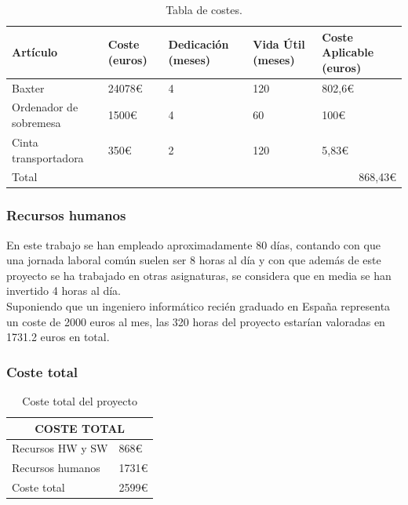 \begin{table}[H]
	\centering
	\begin{tabular}{|p{2cm} | p{2cm} | p{2cm} | p{2cm} | p{2cm} |}
		\hline %
		\textbf{Artículo} & \textbf{Coste} (euros) & \textbf{Dedicación} (meses) & \textbf{Vida Útil} (meses) & \textbf{Coste Aplicable} (euros)\\ %
		\hline	
		Baxter & 24078\euro & 4 & 120 & 802,6\euro \\
		\hline
		Ordenador de sobremesa & 1500\euro & 4 & 60 & 100\euro \\
		\hline
		Cinta transportadora & 350\euro & 2 & 120 & 5,83\euro \\
		\hline
		Total & \multicolumn{4}{r|}{868,43\euro} \\ 
		\hline
	\end{tabular}
	\caption{Tabla de costes.}
\end{table}

\subsubsection{Recursos humanos}
\noindent En este trabajo se han empleado aproximadamente 80 días, contando con que una jornada laboral común suelen ser 8 horas al día y con que además de este proyecto se ha trabajado en otras asignaturas, se considera que en media se han invertido 4 horas al día. \\

\noindent Suponiendo que un ingeniero informático recién graduado en España representa un coste de 2000 euros al mes, las 320 horas del proyecto estarían valoradas en 1731.2 euros en total. \\


\subsubsection{Coste total}
\begin{table}[H]
	\centering
	\begin{tabular}{|p{4cm} | p{4cm} |}
		\hline
		\multicolumn{2}{|c|}{\textbf{COSTE TOTAL}} \\
		\hline 
		Recursos HW y SW & 868\euro \\
		\hline
		Recursos humanos & 1731\euro \\
		\hline
		Coste total & 2599\euro \\
		\hline
	\end{tabular}
	\caption{Coste total del proyecto}
	\label{cuad:ct}
\end{table}

